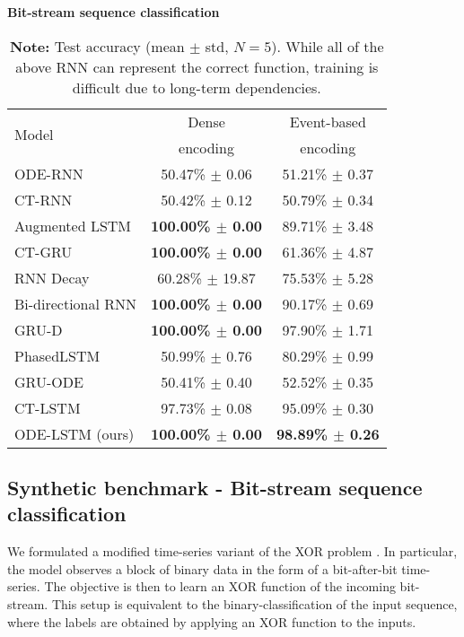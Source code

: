\documentclass{article}
\makeatletter
\def\adl@drawiv#1#2#3{\hskip.5\tabcolsep
    \xleaders#3{#2.5\@tempdimb #1{1}#2.5\@tempdimb}#2\z@ plus1fil minus1fil\relax
    \hskip.5\tabcolsep}
\newcommand{\cdashlinelr}[1]{\noalign{\vskip\aboverulesep
        \global\let\@dashdrawstore\adl@draw
        \global\let\adl@draw\adl@drawiv}
    \cdashline{#1}
    \noalign{\global\let\adl@draw\@dashdrawstore
        \vskip\belowrulesep}}
\makeatother
\begin{document}
\begin{table}[b]
    \centering
    \caption{\textbf{Bit-stream sequence classification}}
    \begin{tabular}{lcc}
    \toprule
        \multirow{2}{*}{Model} & Dense & Event-based  \\
                               & encoding  & encoding\\
        \hline
        ODE-RNN  & 50.47\% $\pm$ 0.06 & 51.21\% $\pm$ 0.37 \\
        CT-RNN & 50.42\% $\pm$ 0.12 & 50.79\% $\pm$ 0.34 \\
        Augmented LSTM  & \textbf{100.00\% $\pm$ 0.00} & 89.71\% $\pm$ 3.48 \\
        CT-GRU  & \textbf{100.00\% $\pm$ 0.00} & 61.36\% $\pm$ 4.87 \\
        RNN Decay  & 60.28\% $\pm$ 19.87 & 75.53\% $\pm$ 5.28 \\
        Bi-directional RNN   & \textbf{100.00\% $\pm$ 0.00} & 90.17\% $\pm$ 0.69 \\
        GRU-D   & \textbf{100.00\% $\pm$ 0.00} & {97.90}\% $\pm$ 1.71 \\
        PhasedLSTM   & 50.99\% $\pm$ 0.76 & 80.29\% $\pm$ 0.99 \\
        GRU-ODE & 50.41\% $\pm$ 0.40 & 52.52\% $\pm$ 0.35\\   
        CT-LSTM & 97.73\% $\pm$ 0.08 & 95.09\% $\pm$ 0.30\\
        \cdashlinelr{1-3}
        ODE-LSTM (ours)  & \textbf{100.00\% $\pm$ 0.00} & \textbf{98.89\% $\pm$ 0.26} \\
        \bottomrule
    \end{tabular}
    \caption*{\footnotesize \textbf{Note:} Test accuracy (mean $\pm$ std, $N=5$). While all of the above RNN can represent the correct function, training is difficult due to long-term dependencies.}
    \label{tab:synthetic}
\end{table}
\subsection{Synthetic benchmark - Bit-stream sequence classification}
We formulated a modified time-series variant of the XOR problem \cite{marvin1969perceptrons}. In particular, the model observes a block of binary data in the form of a bit-after-bit time-series. The objective is then to learn an XOR function of the incoming bit-stream. This setup is equivalent to the binary-classification of the input sequence, where the labels are obtained by applying an XOR function to the inputs. 
\end{document}
